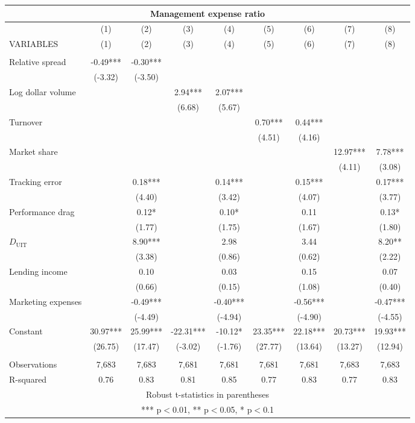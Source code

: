 \documentclass[]{article}
\begin{document}
\begin{tabular}{lcccccccc}
\multicolumn{9}{c}{Management expense ratio} \\ \hline
 & (1) & (2) & (3) & (4) & (5) & (6) & (7) & (8) \\
VARIABLES & (1) & (2) & (3) & (4) & (5) & (6) & (7) & (8) \\ \hline
 &  &  &  &  &  &  &  &  \\
Relative spread & -0.49*** & -0.30*** &  &  &  &  &  &  \\
 & (-3.32) & (-3.50) &  &  &  &  &  &  \\
Log dollar volume &  &  & 2.94*** & 2.07*** &  &  &  &  \\
 &  &  & (6.68) & (5.67) &  &  &  &  \\
Turnover &  &  &  &  & 0.70*** & 0.44*** &  &  \\
 &  &  &  &  & (4.51) & (4.16) &  &  \\
Market share &  &  &  &  &  &  & 12.97*** & 7.78*** \\
 &  &  &  &  &  &  & (4.11) & (3.08) \\ 
Tracking error &  & 0.18*** &  & 0.14*** &  & 0.15*** &  & 0.17*** \\
 &  & (4.40) &  & (3.42) &  & (4.07) &  & (3.77) \\
Performance drag &  & 0.12* &  & 0.10* &  & 0.11 &  & 0.13* \\
 &  & (1.77) &  & (1.75) &  & (1.67) &  & (1.80) \\
$D_\text{UIT}$ &  & 8.90*** &  & 2.98 &  & 3.44 &  & 8.20** \\
 &  & (3.38) &  & (0.86) &  & (0.62) &  & (2.22) \\
Lending income &  & 0.10 &  & 0.03 &  & 0.15 &  & 0.07 \\
 &  & (0.66) &  & (0.15) &  & (1.08) &  & (0.40) \\
Marketing expenses &  & -0.49*** &  & -0.40*** &  & -0.56*** &  & -0.47*** \\
 &  & (-4.49) &  & (-4.94) &  & (-4.90) &  & (-4.55) \\

Constant & 30.97*** & 25.99*** & -22.31*** & -10.12* & 23.35*** & 22.18*** & 20.73*** & 19.93*** \\
 & (26.75) & (17.47) & (-3.02) & (-1.76) & (27.77) & (13.64) & (13.27) & (12.94) \\
 &  &  &  &  &  &  &  &  \\
Observations & 7,683 & 7,683 & 7,681 & 7,681 & 7,681 & 7,681 & 7,683 & 7,683 \\
 R-squared & 0.76 & 0.83 & 0.81 & 0.85 & 0.77 & 0.83 & 0.77 & 0.83 \\ \hline
\multicolumn{9}{c}{ Robust t-statistics in parentheses} \\
\multicolumn{9}{c}{ *** p$<$0.01, ** p$<$0.05, * p$<$0.1} \\
\end{tabular}
\end{document}
